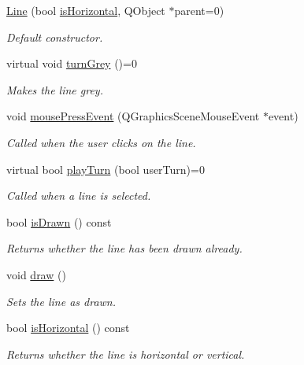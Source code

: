\begin{DoxyCompactItemize}
\item 
\hyperlink{classLine_a556ea343ae2c6118ed775f99b1c1bd0a}{\-Line} (bool \hyperlink{classLine_a799c03e48bd560a9f6c0b2b729e38855}{is\-Horizontal}, \-Q\-Object $\ast$parent=0)
\begin{DoxyCompactList}\small\item\em \-Default constructor. \end{DoxyCompactList}\item 
\hypertarget{classLine_a63f54b0b50d2c6db91fc7d97c15433b1}{virtual void \hyperlink{classLine_a63f54b0b50d2c6db91fc7d97c15433b1}{turn\-Grey} ()=0}\label{classLine_a63f54b0b50d2c6db91fc7d97c15433b1}

\begin{DoxyCompactList}\small\item\em \-Makes the line grey. \end{DoxyCompactList}\item 
void \hyperlink{classLine_aac8ab0980da0a3db6e4991e734462193}{mouse\-Press\-Event} (\-Q\-Graphics\-Scene\-Mouse\-Event $\ast$event)
\begin{DoxyCompactList}\small\item\em \-Called when the user clicks on the line. \end{DoxyCompactList}\item 
virtual bool \hyperlink{classLine_adb2af7d5815c082d2c7864a86af27b14}{play\-Turn} (bool user\-Turn)=0
\begin{DoxyCompactList}\small\item\em \-Called when a line is selected. \end{DoxyCompactList}\item 
bool \hyperlink{classLine_a1adc846d2872638610850cc27e325317}{is\-Drawn} () const 
\begin{DoxyCompactList}\small\item\em \-Returns whether the line has been drawn already. \end{DoxyCompactList}\item 
\hypertarget{classLine_ab6265993bf5acbc28830181c3e712f10}{void \hyperlink{classLine_ab6265993bf5acbc28830181c3e712f10}{draw} ()}\label{classLine_ab6265993bf5acbc28830181c3e712f10}

\begin{DoxyCompactList}\small\item\em \-Sets the line as drawn. \end{DoxyCompactList}\item 
bool \hyperlink{classLine_a799c03e48bd560a9f6c0b2b729e38855}{is\-Horizontal} () const 
\begin{DoxyCompactList}\small\item\em \-Returns whether the line is horizontal or vertical. \end{DoxyCompactList}\end{DoxyCompactItemize}


